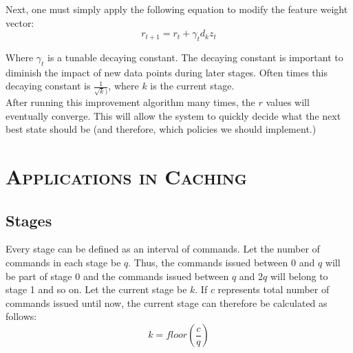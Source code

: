 \documentclass[11pt]{article}
\numberwithin{figure}{section}
\begin{document}
		Next, one must simply apply the following equation to modify the feature weight vector:
		\begin{equation}
		r_{t+1}=r_t+\gamma_td_kz_t
		\end{equation}
		
		Where \begin{math}\gamma_t\end{math} is a tunable decaying constant. The decaying constant is important to diminish the impact of new data points during later stages. Often times this decaying constant is \begin{math}\frac{1}{\sqrt{k})}\end{math}, where \begin{math}k\end{math} is the current stage. \\
		
		After running this improvement algorithm many times, the \begin{math}r\end{math} values will eventually converge. This will allow the system to quickly decide what the next best state should be (and therefore, which policies we should implement.)
		
	\section{\textsc{Applications in Caching}}
		\subsection{Stages}
			Every stage can be defined as an interval of commands. Let the number of commands in each stage be \begin{math}q\end{math}. Thus, the commands issued between 0 and \begin{math}q\end{math} will be part of stage 0 and the commands issued between \begin{math}q\end{math} and \begin{math}2q\end{math} will belong to stage 1 and so on. Let the current stage be \begin{math}k\end{math}. If \begin{math}c\end{math} represents total number of commands issued until now, the current stage can therefore be calculated as follows:
			\begin{equation}
			k=floor(\frac{c}{q})
			\end{equation}
\end{document}
